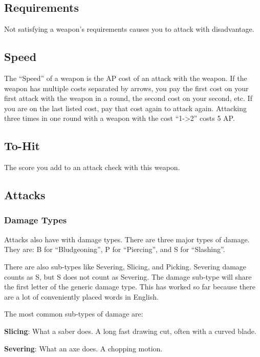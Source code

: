 \documentclass[
  letterpaper,
  DIV=11,
  numbers=noendperiod]{scrartcl}
\begin{document}
\subsection{Requirements}\label{requirements}

Not satisfying a weapon's requirements causes you to attack with
disadvantage.

\subsection{Speed}\label{speed}

The ``Speed'' of a weapon is the AP cost of an attack with the weapon.
If the weapon has multiple costs separated by arrows, you pay the first
cost on your first attack with the weapon in a round, the second cost on
your second, etc. If you are on the last listed cost, pay that cost
again to attack again. Attacking three times in one round with a weapon
with the cost ``1-\textgreater2'' costs 5 AP.

\subsection{To-Hit}\label{to-hit}

The score you add to an attack check with this weapon.

\subsection{Attacks}\label{attacks}

\subsubsection{Damage Types}\label{damage-types}

Attacks also have with damage types. There are three major types of
damage. They are: B for ``Bludgeoning'', P for ``Piercing'', and S for
``Slashing''.

There are also sub-types like Severing, Slicing, and Picking. Severing
damage counts as S, but S does not count as Severing. The damage
sub-type will share the first letter of the generic damage type. This
has worked so far because there are a lot of conveniently placed words
in English.

The most common sub-types of damage are:

\textbf{Slicing}: What a saber does. A long fast drawing cut, often with
a curved blade.

\textbf{Severing}: What an axe does. A chopping motion.
\end{document}
